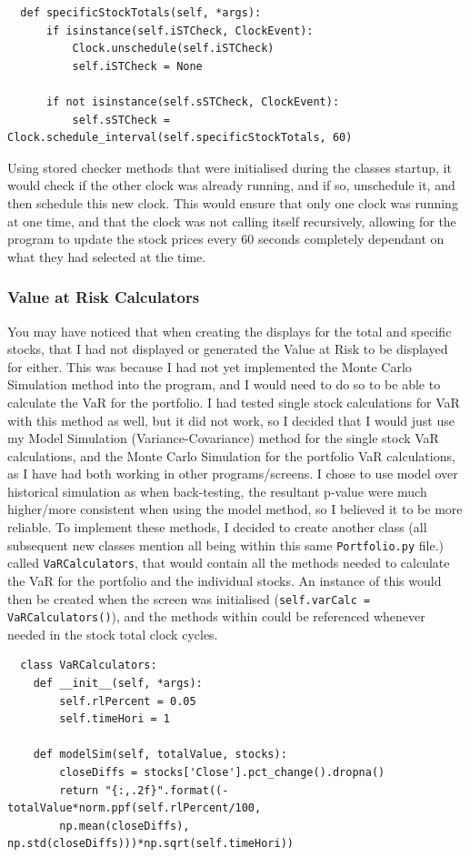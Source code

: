 \documentclass{article}
\begin{document}
\begin{verbatim}
  def specificStockTotals(self, *args):
      if isinstance(self.iSTCheck, ClockEvent):
          Clock.unschedule(self.iSTCheck)
          self.iSTCheck = None

      if not isinstance(self.sSTCheck, ClockEvent):
          self.sSTCheck = Clock.schedule_interval(self.specificStockTotals, 60)
\end{verbatim}

\vspace{0.3cm}
Using stored checker methods that were initialised during the classes startup, it would check if the other clock was already running, and if so, unschedule it, and then schedule this new clock. This would ensure that only one clock was running at one time, and that the clock was not calling itself recursively, allowing for the program to update the stock prices every 60 seconds completely dependant on what they had selected at the time.\\\vspace{0.3cm}

\subsubsection{Value at Risk Calculators}
You may have noticed that when creating the displays for the total and specific stocks, that I had not displayed or generated the Value at Risk to be displayed for either. This was because I had not yet implemented the Monte Carlo Simulation method into the program, and I would need to do so to be able to calculate the VaR for the portfolio. I had tested single stock calculations for VaR with this method as well, but it did not work, so I decided that I would just use my Model Simulation (Variance-Covariance) method for the single stock VaR calculations, and the Monte Carlo Simulation for the portfolio VaR calculations, as I have had both working in other programs/screens. I chose to use model over historical simulation as when back-testing, the resultant p-value were much higher/more consistent when using the model method, so I believed it to be more reliable. To implement these methods, I decided to create another class (all subsequent new classes mention all being within this same \texttt{Portfolio.py} file.) called \texttt{VaRCalculators}, that would contain all the methods needed to calculate the VaR for the portfolio and the individual stocks. An instance of this would then be created when the screen was initialised (\texttt{self.varCalc = VaRCalculators()}), and the methods within could be referenced  whenever needed in the stock total clock cycles.\\\vspace{0.3cm}
\newpage
\begin{verbatim}
  class VaRCalculators:
    def __init__(self, *args):
        self.rlPercent = 0.05
        self.timeHori = 1

    def modelSim(self, totalValue, stocks):
        closeDiffs = stocks['Close'].pct_change().dropna()
        return "{:,.2f}".format((-totalValue*norm.ppf(self.rlPercent/100,
        np.mean(closeDiffs), np.std(closeDiffs)))*np.sqrt(self.timeHori))
\end{verbatim}
\end{document}

